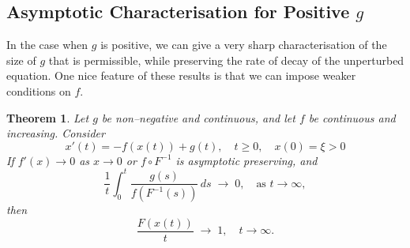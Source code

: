 \documentclass[a4paper,10pt,reqno]{amsart}
\numberwithin{equation}{section}
\newtheorem{theorem}{Theorem}
\theoremstyle{definition}
\theoremstyle{remark}
\DeclareMathOperator{\1}{\mathbbm 1}
\begin{document}
	\subsection{Asymptotic Characterisation for Positive $g$}
	In the case when $g$ is positive, we can give a very sharp characterisation of the size of $g$ that is permissible, while preserving the rate of decay of the unperturbed equation. One nice feature of these results is that we can impose weaker conditions on $f$. 
	\begin{theorem}
		Let $g$ be non--negative and continuous, and let $f$ be continuous and increasing. Consider
		\[
		x'(t) = -f(x(t)) + g(t), \quad t \geq 0, \quad x(0)=\xi>0
		\]
		If $f'(x)\to 0$ as $x\to 0$ or $f\circ F^{-1}$ is asymptotic preserving, and 
		\begin{equation} \label{eq.mixedcondn}
			\frac{1}{t} \int_0^t \frac{g(s)}{f(F^{-1}(s))} \, ds \;\to\; 0, 
			\quad \text{as } t \to \infty,
		\end{equation}
		then
		\[
		\frac{F(x(t))}{t} \;\to\; 1, \quad t \to \infty.
		\]
	\end{theorem}
\end{document}
